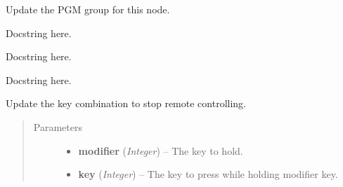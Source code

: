 \documentclass[letterpaper,10pt,english]{sphinxmanual}
\begin{document}

\begin{fulllineitems}
\label{diwavars:diwavars.update_PGM_group}
Update the PGM group for this node.

\end{fulllineitems}


\begin{fulllineitems}
\label{diwavars:diwavars.update_audio}
Docstring here.

\end{fulllineitems}


\begin{fulllineitems}
\label{diwavars:diwavars.update_camera_vars}
Docstring here.

\end{fulllineitems}


\begin{fulllineitems}
\label{diwavars:diwavars.update_database_vars}
Docstring here.

\end{fulllineitems}


\begin{fulllineitems}
\label{diwavars:diwavars.update_keys}
Update the key combination to stop remote controlling.
\begin{quote}\begin{description}
\item[{Parameters}] \leavevmode\begin{itemize}
\item {} 
\textbf{modifier} (\emph{Integer}) -- The key to hold.

\item {} 
\textbf{key} (\emph{Integer}) -- The key to press while holding modifier key.

\end{itemize}

\end{description}\end{quote}

\end{fulllineitems}
\end{document}
